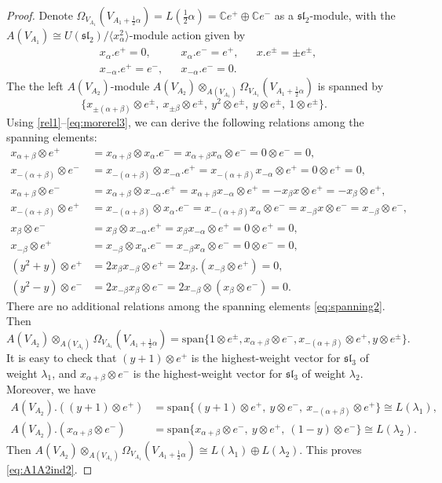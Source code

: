 \documentclass[12pt,a4paper,reqno]{amsart}
\numberwithin{equation}{section}
\numberwithin{equation}{section}
\theoremstyle{definition}
\def \C {\mathbb{C}}
\def\la{\lambda}
\def \al{\alpha}
\def \b {\beta}
\def \op {\oplus}
\def\o{\otimes}
\def\spn{\mathrm{span}}
\def\Om{\Omega}
\def\<{\langle}
\def\>{\rangle}
\def\sl{\mathfrak{sl}}
\begin{document}
\begin{proof}
		Denote $\Om_{V_{A_1}}(V_{A_1+\frac{1}{2}\al})=L(\frac{1}{2}\al)=\C e^+\op \C e^-$ as a $\sl_2$-module, with the $A(V_{A_1})\cong U(\sl_2)/\<x_\al^2\>$-module action  given by 
		\begin{align*}
			& x_\al. e^+=0,&& x_\al. e^-=e^+,&& x. e^\pm=\pm e^\pm,\\
			& x_{-\al}.e^+=e^-,&& x_{-\al}.e^-=0.&&
		\end{align*}
		The the left $A(V_{A_2})$-module $A(V_{A_2})\o _{A(V_{A_1})} \Om_{V_{A_1}}(V_{A_1+\frac{1}{2}\al})$ is spanned by 
		\begin{equation}\label{eq:spanning2}
			\{x_{\pm(\al+\b)}\o e^\pm,\ x_{\pm \b}\o e^\pm,\ y^2\o e^\pm,\ y\o e^\pm,\   1\o e^\pm \}.
		\end{equation}
		Using  \eqref{rel1}--\eqref{eq:morerel3}, we can derive the following relations among the spanning elements:
		\begin{align*}
			x_{\al+\b}\o e^+&=x_{\al+\b}\o x_\al.e^-=x_{\al+\b}x_\al\o e^-=0\o e^-=0,\\
			x_{-(\al+\b)}\o e^-&= x_{-(\al+\b)}\o x_{-\al}.e^+=x_{-(\al+\b)}x_{-\al}\o e^+=0\o e^+=0,\\
			x_{\al+\b}\o e^-&=x_{\al+\b}\o x_{-\al}.e^+=x_{\al+\b} x_{-\al}\o e^+= -x_\b x\o e^+=-x_\b\o e^+,\\
			x_{-(\al+\b)}\o e^+&= x_{-(\al+\b)}\o x_\al. e^-=x_{-(\al+\b)}x_\al\o e^-=x_{-\b}x\o e^-=x_{-\b}\o e^-,\\
			x_{\b}\o e^-&=x_\b\o x_{-\al}.e^+=x_\b x_{-\al}\o e^+=0\o e^+=0,\\
			x_{-\b}\o e^+&= x_{-\b}\o x_{\al}.e^-=x_{-\b}x_\al\o e^-=0\o e^-=0,\\
			(y^2+y)\o e^+&=2x_\b x_{-\b}\o e^+=2x_\b. (x_{-\b}\o e^+)=0,\\
			(y^2-y)\o e^-&= 2x_{-\b}x_\b\o e^-=2x_{-\b}\o (x_\b\o e^-)=0.
		\end{align*}
		There are no additional relations among the spanning elements \eqref{eq:spanning2}. Then
		$$A(V_{A_2})\o _{A(V_{A_1})} \Om_{V_{A_1}}(V_{A_1+\frac{1}{2}\al})=\spn\{1\o e^\pm, x_{\al+\b}\o e^-, x_{-(\al+\b)}\o e^+, y\o e^\pm \}.$$
		It is easy to check that  $(y+1)\o e^+$ is the highest-weight vector for $\sl_3$ of weight $\la_1$, and $x_{\al+\b}\o e^-$ is the highest-weight vector for $\sl_3$ of weight $\la_2$. Moreover, we have 
		\begin{align*}
			A(V_{A_2}).((y+1)\o e^+)&=\spn\{(y+1)\o e^+,\ y\o e^-,\ x_{-(\al+\b)}\o e^+ \}\cong L(\la_1),\\
			A(V_{A_2}).(x_{\al+\b}\o e^-)&=\spn\{x_{\al+\b}\o e^-,\ y\o e^+,\ (1-y)\o e^- \}\cong L(\la_2). 
		\end{align*}
		Then $A(V_{A_2})\o _{A(V_{A_1})} \Om_{V_{A_1}}(V_{A_1+\frac{1}{2}\al})\cong L(\la_1)\op L(\la_2)$. This proves \eqref{eq:A1A2ind2}. 
		

\end{proof}
\end{document}
